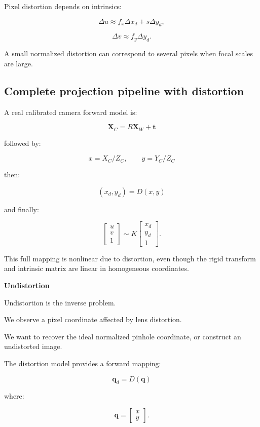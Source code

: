 Pixel distortion depends on intrinsics:

\[
 \Delta u\approx f_x\Delta x_d+s\Delta y_d,
\]

\[
 \Delta v\approx f_y\Delta y_d.
\]

A small normalized distortion can correspond to several pixels when focal scales are large.

\subsection{Complete projection pipeline with distortion}\label{02-foundations-ii-ch035-complete-projection-pipeline-with-distortion}

A real calibrated camera forward model is:

\[
 \boxed{ \mathbf X_C=R\mathbf X_W+\mathbf t }
\]

followed by:

\[
 \boxed{ x=X_C/Z_C,\qquad y=Y_C/Z_C }
\]

then:

\[
 \boxed{ (x_d,y_d)=D(x,y) }
\]

and finally:

\[
 \boxed{ \begin{bmatrix}u\\v\\1\end{bmatrix} \sim K \begin{bmatrix}x_d\\y_d\\1\end{bmatrix} }.
\]

This full mapping is nonlinear due to distortion, even though the rigid transform and intrinsic matrix are linear in homogeneous coordinates.

\textbf{Undistortion}

Undistortion is the inverse problem.

We observe a pixel coordinate affected by lens distortion.

We want to recover the ideal normalized pinhole coordinate, or construct an undistorted image.

The distortion model provides a forward mapping:

\[
 \boxed{ \mathbf q_d=D(\mathbf q) }
\]

where:

\[
 \mathbf q= \begin{bmatrix}x\\y\end{bmatrix}.
\]

